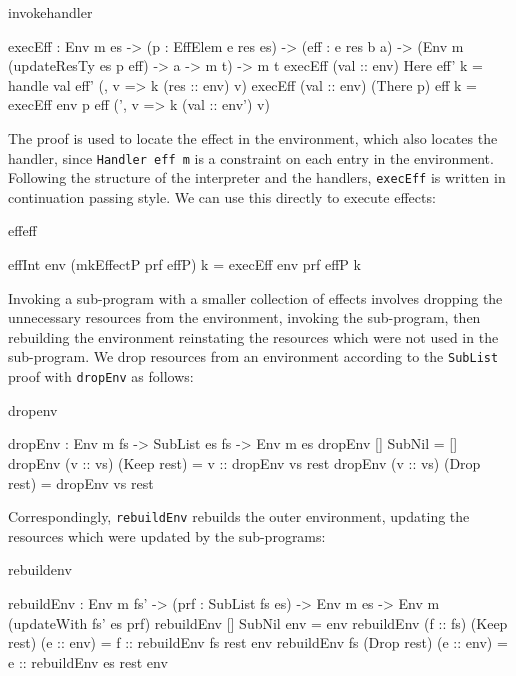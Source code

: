 \noindent
\begin{SaveVerbatim}{invokehandler}

 execEff : Env m es -> (p : EffElem e res es) -> 
           (eff : e res b a) ->
           (Env m (updateResTy es p eff) -> a -> m t) -> 
           m t
 execEff (val :: env) Here eff' k 
     = handle val eff' (\res, v => k (res :: env) v)
 execEff (val :: env) (There p) eff k 
     = execEff env p eff (\env', v => k (val :: env') v)

\end{SaveVerbatim}

\noindent
The proof is used to locate the effect in the environment, which also locates
the handler, since \texttt{Handler eff m} is a constraint on each entry in
the environment. Following the structure of the interpreter and the handlers,
\texttt{execEff} is written in continuation passing style. We can use this
directly to execute effects:

\begin{SaveVerbatim}{effeff}

effInt env (mkEffectP prf effP) k 
                   = execEff env prf effP k

\end{SaveVerbatim}

\noindent
Invoking a sub-program with a smaller collection of effects involves dropping
the unnecessary resources from the environment, invoking the sub-program, then
rebuilding the environment reinstating the resources which were not used in the
sub-program. We drop resources from an environment according to the 
\texttt{SubList} proof with \texttt{dropEnv} as follows:

\begin{SaveVerbatim}{dropenv}

dropEnv : Env m fs -> SubList es fs -> Env m es
dropEnv [] SubNil = []
dropEnv (v :: vs) (Keep rest) = v :: dropEnv vs rest
dropEnv (v :: vs) (Drop rest) = dropEnv vs rest

\end{SaveVerbatim}

\noindent
Correspondingly, \texttt{rebuildEnv} rebuilds the outer environment, updating
the resources which were updated by the sub-programs:

\begin{SaveVerbatim}{rebuildenv}

rebuildEnv : Env m fs' -> (prf : SubList fs es) -> 
             Env m es -> Env m (updateWith fs' es prf) 
rebuildEnv []        SubNil      env = env
rebuildEnv (f :: fs) (Keep rest) (e :: env) 
      = f :: rebuildEnv fs rest env
rebuildEnv fs        (Drop rest) (e :: env) 
      = e :: rebuildEnv es rest env

\end{SaveVerbatim}

